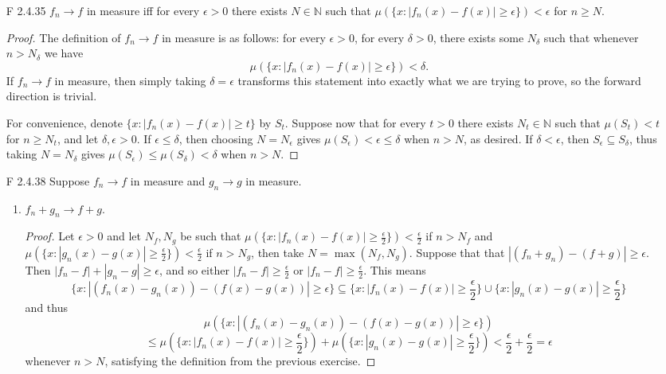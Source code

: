 \documentclass[10pt]{article}
\newcommand{\N}{\mathbb{N}}
\begin{document}
\begin{enumerate}
\item[F 2.4.35] $f_n \rightarrow f$ in measure iff for every $\epsilon > 0$ there exists $N \in \N$ such that $\mu(\{x : |f_n(x) - f(x)| \geq \epsilon\}) < \epsilon$ for $n \geq N$.

\begin{proof}
The definition of $f_n \rightarrow f$ in measure is as follows: for every $\epsilon > 0$, for every $\delta > 0$, there exists some $N_\delta$ such that whenever $n > N_\delta$ we have
$$
\mu(\{x : |f_n(x) - f(x)| \geq \epsilon \}) < \delta.
$$
If $f_n \rightarrow f$ in measure, then simply taking $\delta = \epsilon$ transforms this statement into exactly what we are trying to prove, so the forward direction is trivial.

For convenience, denote $\{x : |f_n(x) - f(x)| \geq t\}$ by $S_t$.  Suppose now that for every $t > 0$ there exists $N_t \in \N$ such that $\mu(S_t) < t$ for $n \geq N_t$, and let $\delta, \epsilon > 0$.  If $\epsilon \leq \delta$, then choosing $N = N_\epsilon$ gives $\mu(S_\epsilon) < \epsilon \leq \delta$ when $n > N$, as desired.  If $\delta < \epsilon$, then $S_\epsilon \subseteq S_\delta$, thus taking $N = N_\delta$ gives $\mu(S_\epsilon) \leq \mu(S_\delta) < \delta$ when $n > N$.
\end{proof}

\item[F 2.4.38] Suppose $f_n \rightarrow f$ in measure and $g_n \rightarrow g$ in measure.
\begin{enumerate}
\item $f_n + g_n \rightarrow f + g$.

\begin{proof}
Let $\epsilon > 0$ and let $N_f,N_g$ be such that $\mu(\{x : |f_n(x) - f(x)| \geq \frac{\epsilon}{2} \}) < \frac{\epsilon}{2}$ if $n > N_f$ and $\mu(\{x : |g_n(x) - g(x)| \geq \frac{\epsilon}{2} \}) < \frac{\epsilon}{2}$ if $n > N_g$, then take $N = \max(N_f,N_g)$.  Suppose that that $|(f_n+g_n) - (f+g)| \geq \epsilon$.  Then $|f_n -f| + |g_n - g| \geq \epsilon$, and so either $|f_n - f| \geq \frac{\epsilon}{2}$ or $|f_n - f| \geq \frac{\epsilon}{2}$.  This means
$$
\{x : |(f_n(x) - g_n(x)) - (f(x) - g(x))| \geq \epsilon \} \subseteq \{x : |f_n(x) - f(x)| \geq \frac{\epsilon}{2} \} \cup \{x : |g_n(x) - g(x)| \geq \frac{\epsilon}{2} \}
$$
and thus
$$
\mu(\{x : |(f_n(x) - g_n(x)) - (f(x) - g(x))| \geq \epsilon \})
$$
$$
\leq \mu(\{x : |f_n(x) - f(x)| \geq \frac{\epsilon}{2} \}) + \mu(\{x : |g_n(x) - g(x)| \geq \frac{\epsilon}{2} \}) < \frac{\epsilon}{2} + \frac{\epsilon}{2} = \epsilon
$$
whenever $n > N$, satisfying the definition from the previous exercise.
\end{proof}


\end{enumerate}
\end{enumerate}
\end{document}
